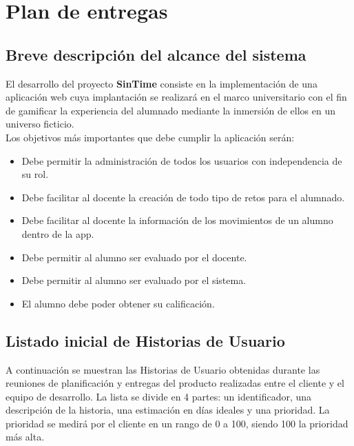\setcounter{chapter}{4}
\setcounter{section}{0}
\setcounter{subsection}{0}
\chapter{Plan de entregas}

\section{Breve descripción del alcance del sistema}
El desarrollo del proyecto \textbf{SinTime} consiste en la implementación de una aplicación web cuya implantación se realizará en el marco universitario con el fin de gamificar la experiencia del alumnado mediante la inmersión de ellos en un universo ficticio.\\

Los objetivos más importantes que debe cumplir la aplicación serán:

\begin{itemize}
	\item Debe permitir la administración de todos los usuarios con independencia de su rol.
	\item Debe facilitar al docente la creación de todo tipo de retos para el alumnado.
	\item Debe facilitar al docente la información de los movimientos de un alumno dentro de la app.
	\item Debe permitir al alumno ser evaluado por el docente.
	\item Debe permitir al alumno ser evaluado por el sistema.
	\item El alumno debe poder obtener su calificación.
\end{itemize}

\section{Listado inicial de Historias de Usuario}

A continuación se muestran las Historias de Usuario obtenidas durante las reuniones de planificación y entregas del producto realizadas entre el cliente y el equipo de desarrollo. La lista se divide en 4 partes: un identificador, una descripción de la historia, una estimación en días ideales y una prioridad. La prioridad se medirá por el cliente en un rango de 0 a 100, siendo 100 la prioridad más alta.\\



